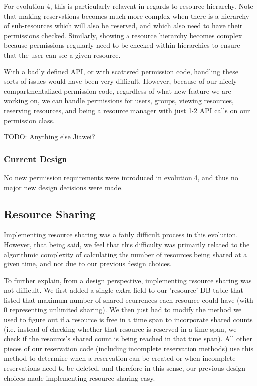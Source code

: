 \documentclass[12pt]{article}
\begin{document}
For evolution 4, this is particularly relavent in regards to resource hierarchy. Note that making reservations becomes much more complex when there is a hierarchy of sub-resources which will also be reserved, and which also need to have their permissions checked. Similarly, showing a resource hierarchy becomes complex because permissions regularly need to be checked within hierarchies to ensure that the user can see a given resource. 

With a badly defined API, or with scattered permission code, handling these sorts of issues would have been very difficult. However, because of our nicely compartmentalized permission code, regardless of what new feature we are working on, we can handle permissions for users, groups, viewing resources, reserving resources, and being a resource manager with just 1-2 API calls on our permission class. 

TODO: Anything else Jiawei?

\subsubsection{Current Design}
No new permission requirements were introduced in evolution 4, and thus no major new design decisions were made. 


\subsection{Resource Sharing}
Implementing resource sharing was a fairly difficult process in this evolution. However, that being said, we feel that this difficulty was primarily related to the algorithmic complexity of calculating the number of resources being shared at a given time, and not due to our previous design choices. 

To further explain, from a design perspective, implementing resource sharing was not difficult. We first added a single extra field to our 'resource' DB table that listed that maximum number of shared ocurrences each resource could have (with 0 representing unlimited sharing). We then just had to modify the method we used to figure out if a resource is free in a time span to incorporate shared counts (i.e. instead of checking whether that resource is reserved in a time span, we check if the resource's shared count is being reached in that time span). All other pieces of our reservation code (including incomplete reservation methods) use this method to determine when a reservation can be created or when incomplete reservations need to be deleted, and therefore in this sense, our previous design choices made implementing resource sharing easy. 
\end{document}
